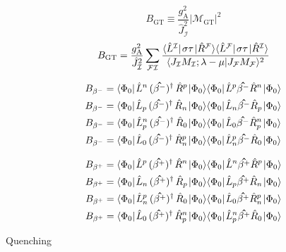 \documentclass[thesis.tex]{subfiles}
\begin{document}
\begin{equation}
  B_{\text{GT}} \equiv \frac{g^{2}_{\text{A}}}{\hat{J}^{2}_{\mathcal{I}}}\lvert\mathcal{M}_{\text{GT}}\rvert^{2}
\end{equation}
\begin{equation}
  B_{\text{GT}} = \frac{g^{2}_{\text{A}}}{\hat{J}^{2}_{\mathcal{I}}}\sum_{\mathcal{F}\mathcal{I}}\frac{\element{\Lop^{\mathcal{I}}}{\mathbf{\sigma\tau}}{\Rop^{\mathcal{F}}}\element{\Lop^{\mathcal{F}}}{\mathbf{\sigma\tau}}{\Rop^{\mathcal{I}}}}{\braket{J_{\mathcal{I}}M_{\mathcal{I}};\lambda-\mu}{J_{\mathcal{F}}M_{\mathcal{F}}}^{2}}
\end{equation}


\begin{gather}
  B_{\beta^{-}} = \element{\Ref}{\Lop^{n}\mathop{(\mathbf{\hat{\beta^{-}}})^{\dagger}}\Rop^{p}}{\Ref}\element{\Ref}{\Lop^{p}\mathbf{\hat{\beta^{-}}}\Rop^{n}}{\Ref} \\
  B_{\beta^{-}} = \element{\Ref}{\Lop_{p}\mathop{(\mathbf{\hat{\beta^{-}}})^{\dagger}}\Rop_{n}}{\Ref}\element{\Ref}{\Lop_{n}\mathbf{\hat{\beta^{-}}}\Rop_{p}}{\Ref} \\
  B_{\beta^{-}} = \element{\Ref}{\Lop^{n}_{p}\mathop{(\mathbf{\hat{\beta^{-}}})^{\dagger}}\Rop_{0}}{\Ref}\element{\Ref}{\Lop_{0}\mathbf{\hat{\beta^{-}}}\Rop^{n}_{p}}{\Ref} \\
  B_{\beta^{-}} = \element{\Ref}{\Lop_{0}\mathop{(\mathbf{\hat{\beta^{-}}})^{\dagger}}\Rop^{p}_{n}}{\Ref}\element{\Ref}{\Lop^{p}_{n}\mathbf{\hat{\beta^{-}}}\Rop_{0}}{\Ref}
\end{gather}


\begin{gather}
  B_{\beta^{+}} = \element{\Ref}{\Lop^{p}\mathop{(\mathbf{\hat{\beta^{+}}})^{\dagger}}\Rop^{n}}{\Ref}\element{\Ref}{\Lop^{n}\mathbf{\hat{\beta^{+}}}\Rop^{p}}{\Ref} \\
  B_{\beta^{+}} = \element{\Ref}{\Lop_{n}\mathop{(\mathbf{\hat{\beta^{+}}})^{\dagger}}\Rop_{p}}{\Ref}\element{\Ref}{\Lop_{p}\mathbf{\hat{\beta^{+}}}\Rop_{n}}{\Ref} \\
  B_{\beta^{+}} = \element{\Ref}{\Lop^{p}_{n}\mathop{(\mathbf{\hat{\beta^{+}}})^{\dagger}}\Rop_{0}}{\Ref}\element{\Ref}{\Lop_{0}\mathbf{\hat{\beta^{+}}}\Rop^{p}_{n}}{\Ref} \\
  B_{\beta^{+}} = \element{\Ref}{\Lop_{0}\mathop{(\mathbf{\hat{\beta^{+}}})^{\dagger}}\Rop^{n}_{p}}{\Ref}\element{\Ref}{\Lop^{n}_{p}\mathbf{\hat{\beta^{+}}}\Rop_{0}}{\Ref}
\end{gather}


Quenching \cite{HARDY2005,TOWNER2008,KUBODERA1978,OSET1979}
\end{document}
